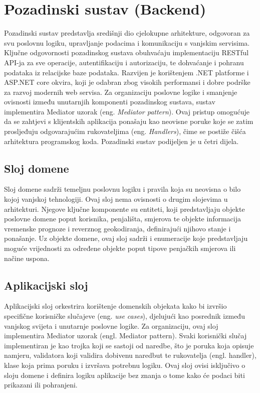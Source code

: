 \section{Pozadinski sustav (Backend)}

Pozadinski sustav predstavlja središnji dio cjelokupne arhitekture, odgovoran za svu poslovnu logiku, upravljanje podacima i komunikaciju s vanjskim servisima. Ključne odgovornosti pozadinskog sustava obuhvaćaju implementaciju RESTful API-ja za sve operacije, autentifikaciju i autorizaciju, te dohvaćanje i pohranu podataka iz relacijske baze podataka. Razvijen je korištenjem .NET platforme i ASP.NET core okvira, koji je odabran zbog visokih performansi i dobre podrške za razvoj modernih web servisa. Za organizaciju poslovne logike i smanjenje ovisnosti između unutarnjih komponenti pozadinskog sustava, sustav implementira Mediator uzorak (eng. \textit{Mediator pattern}). Ovaj pristup omogućuje da se zahtjevi s klijentskih aplikacija ponašaju kao neovisne poruke koje se zatim prosljeđuju odgovarajućim rukovateljima (eng. \textit{Handlers}), čime se postiže čišća arhitektura programskog koda. Pozadinski sustav podijeljen je u četri dijela.

\subsection{Sloj domene}

Sloj domene sadrži temeljnu poslovnu logiku i pravila koja su neovisna o bilo kojoj vanjskoj tehnologiji. Ovaj sloj nema ovisnosti o drugim slojevima u arhitekturi. Njegove ključne komponente su entiteti, koji predstavljaju objekte poslovne domene poput korisnika, penjališta, smjerova te objekte informacija vremenske prognoze i reverznog geokodiranja, definirajući njihovo stanje i ponašanje. Uz objekte domene, ovaj sloj sadrži i enumeracije koje predstavljaju moguće vrijednosti za određene objekte poput tipove penjačkih smjerova ili načine uspona.

\subsection{Aplikacijski sloj}

Aplikacijski sloj orkestrira korištenje domenskih objekata kako bi izvršio specifične korisničke slučajeve (eng. \textit {use cases}), djelujući kao posrednik između vanjskog svijeta i unutarnje poslovne logike. Za organizaciju, ovaj sloj implementira Mediator uzorak (engl. Mediator pattern). Svaki korisnički slučaj implementiran je kao trojka koji se sastoji od naredbe, što je poruka koja opisuje namjeru, validatora koji validira dobivenu naredbut te rukovatelja (engl. handler), klase koja prima poruku i izvršava potrebnu logiku. Ovaj sloj ovisi isključivo o sloju domene i definira logiku aplikacije bez znanja o tome kako će podaci biti prikazani ili pohranjeni.



